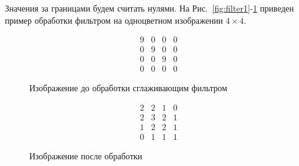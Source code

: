 Значения за границами будем считать нулями. На Рис.~\ref{fig:filter1}-\ref{fig:filter2} приведен пример обработки фильтром на одноцветном изображении $4 \times 4$.

\begin{figure}[h!]
    \centering
    \begin{minipage}{0.3\textwidth}
        $$
            \begin{matrix}
                9 & 0 & 0 & 0 \\
                0 & 9 & 0 & 0 \\
                0 & 0 & 9 & 0 \\
                0 & 0 & 0 & 0
            \end{matrix}
        $$
        \caption{Изображение до обработки сглаживающим фильтром}
        \label{fig:filter1}
    \end{minipage} %
    \hspace{0.1\textwidth}
    \begin{minipage}{0.3\textwidth}
        $$
            \begin{matrix}
                2 & 2 & 1 & 0 \\
                2 & 3 & 2 & 1 \\
                1 & 2 & 2 & 1 \\
                0 & 1 & 1 & 1
            \end{matrix}
        $$
        \caption{Изображение после обработки}
        \label{fig:filter2}
    \end{minipage}
\end{figure}

